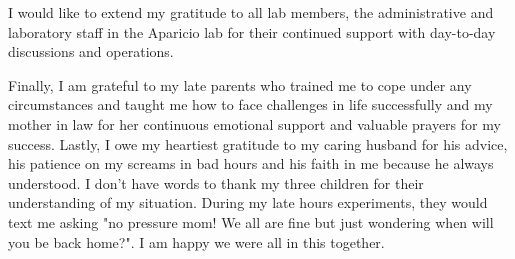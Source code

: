 I would like to extend my gratitude to all lab members, the administrative and laboratory staff in the Aparicio lab for their continued support with day-to-day discussions and operations.

Finally, I am grateful to my late parents who trained me to cope under any circumstances and taught me how to face challenges in life successfully and my mother in law for her continuous emotional support and valuable prayers for my success. Lastly, I owe my heartiest gratitude to my caring husband for his advice, his patience on my screams in bad hours and his faith in me because he always understood. I don't have words to thank my three children for their understanding of my situation. During my late hours experiments, they would text me asking "no pressure mom! We all are fine but just wondering when will you be back home?". I am happy we were all in this together.